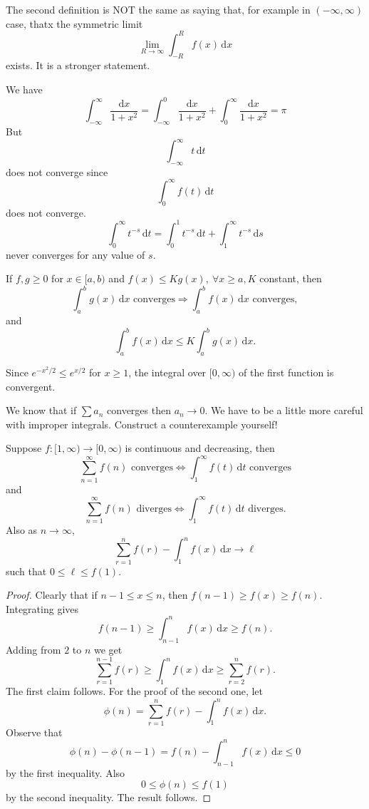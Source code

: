 \begin{remark}
    The second definition is NOT the same as saying that, for example in $(-\infty,\infty) $ case, thatx the symmetric limit
    \[
        \lim_{R \to \infty} \int_{-R}^{R} f(x) \,\mathrm{d}x
    \]
    exists. It is a stronger statement.
\end{remark}
\begin{example}
    We have
    $$\int_{-\infty}^\infty\frac{\mathrm dx}{1+x^2}=\int_{-\infty}^0\frac{\mathrm dx}{1+x^2}+\int_{0}^\infty\frac{\mathrm dx}{1+x^2}=\pi$$
    But
    $$\int_{-\infty}^\infty t\,\mathrm dt$$
    does not converge since
    $$\int_0^\infty f(t)\,\mathrm dt$$
    does not converge.
    $$\int_0^\infty t^{-s}\,\mathrm dt=\int_0^1 t^{-s}\,\mathrm dt+\int_1^\infty t^{-s}\,\mathrm ds$$
    never converges for any value of $s$.
\end{example}
\begin{sprop}
    If $f,g\ge 0$ for $x\in [a,b)$ and $ f(x)\le Kg(x),\ \forall x\ge a, K $ constant, then 
    \[
        \int_{a}^{b} g(x) \,\mathrm{d}x \text{ converges} \Longrightarrow \int_{a}^{b} f(x) \,\mathrm{d}x \text{ converges},
    \]
    and 
    \[
        \int_{a}^{b} f(x) \,\mathrm{d}x\le K \int_{a}^{b} g(x) \,\mathrm{d}x.
    \]
\end{sprop}
\begin{example}
    Since $ e^{-x^2/2}\le e^{x/2} $ for $x\ge 1$, the integral over $ [0,\infty) $ of the first function is convergent.
\end{example}
\begin{remark}
    We know that if $ \sum a_n $ converges then $ a_n\to 0 $. We have to be a little more careful with improper integrals. Construct a counterexample yourself!
\end{remark}

\begin{theorem}
    Suppose $f:[1,\infty)\to[0,\infty)$ is continuous and decreasing, then
    $$\sum_{n=1}^\infty f(n) \text{ converges} \Longleftrightarrow \int_1^\infty f(t)\,\mathrm dt \text{ converges}$$
    and 
    \[
        \sum_{n=1}^\infty f(n) \text{ diverges} \Longleftrightarrow \int_1^\infty f(t)\,\mathrm dt \text{ diverges}.
    \]
    Also as $ n\to \infty $, 
    \[
        \sum_{r=1}^{n}f(r)-\int_{1}^{n} f(x) \,\mathrm{d}x\to \ell 
    \]
    such that $ 0\le \ell \le f(1) $.
\end{theorem}
\begin{proof}
    Clearly that if $ n-1\le x\le n $, then $ f(n-1)\ge f(x)\ge f(n) $. Integrating gives 
    \[
        f(n-1)\ge \int_{n-1}^{n} f(x) \,\mathrm{d}x\ge f(n).
    \]
    Adding from $2$ to $n$ we get 
    \[
        \sum_{r=1}^{n-1}f(r) \ge \int_{1}^{n} f(x) \,\mathrm{d}x\ge \sum_{r=2}^{n}f(r).
    \]
    The first claim follows. For the proof of the second one, let
    \[
        \phi(n) = \sum_{r=1}^{n}f(r)-\int_{1}^{n} f(x) \,\mathrm{d}x.
    \]
    Observe that 
    \[
        \phi(n)-\phi(n-1) = f(n)-\int_{n-1}^{n} f(x) \,\mathrm{d}x\le 0
    \]
    by the first inequality. Also 
    \[
        0\le \phi(n)\le f(1)
    \]
    by the second inequality. The result follows.
\end{proof}

